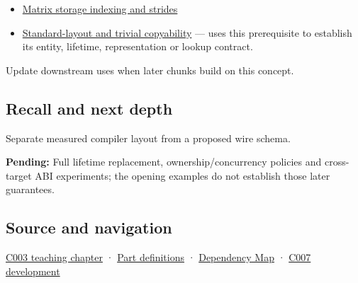 \begin{itemize}
\item
  \hyperref[appendix-ffdc1d4e5350]{Matrix storage indexing and strides}
\item
  \hyperref[appendix-958870a64c53]{Standard-layout and trivial copyability} --- uses this prerequisite to establish its entity, lifetime, representation or lookup contract.
\end{itemize}

Update downstream uses when later chunks build on this concept.

\subsection{Recall and next depth}\label{appendix-c4ac6bb0fff8-recall-and-next-depth}

Separate measured compiler layout from a proposed wire schema.

\textbf{Pending:} Full lifetime replacement, ownership/concurrency policies and cross-target ABI experiments; the opening examples do not establish those later guarantees.

\subsection{Source and navigation}\label{appendix-c4ac6bb0fff8-source-and-navigation}

\hyperref[01-foundations-i-ch002-where-the-bytes-live]{C003 teaching chapter} · \hyperref[appendix-fd090d982a15-m003---parts-41-60]{Part definitions} · \hyperref[appendix-4ad47bdd269a]{Dependency Map} · \hyperref[01-foundations-i-ch003-bringing-the-object-model-back-to-bytes]{C007 development}
